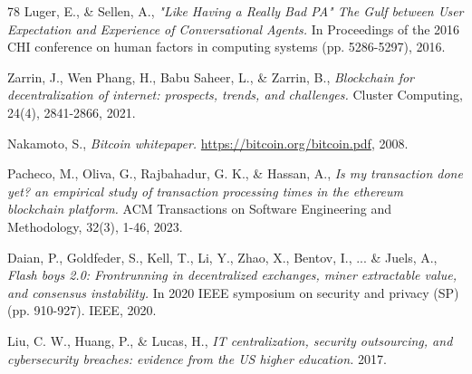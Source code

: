 \documentclass[preprint,12pt]{elsarticle}
\begin{document}
\begin{thebibliography}{78}
Luger, E., \& Sellen, A.,
\textit{"Like Having a Really Bad PA" The Gulf between User Expectation and Experience of Conversational Agents.}
In Proceedings of the 2016 CHI conference on human factors in computing systems (pp. 5286-5297), 2016.

Zarrin, J., Wen Phang, H., Babu Saheer, L., \& Zarrin, B.,
\textit{Blockchain for decentralization of internet: prospects, trends, and challenges.}
Cluster Computing, 24(4), 2841-2866, 2021.

Nakamoto, S.,
\textit{Bitcoin whitepaper.}
\url{https://bitcoin.org/bitcoin.pdf}, 2008.

Pacheco, M., Oliva, G., Rajbahadur, G. K., \& Hassan, A.,
\textit{Is my transaction done yet? an empirical study of transaction processing times in the ethereum blockchain platform.}
ACM Transactions on Software Engineering and Methodology, 32(3), 1-46, 2023.

Daian, P., Goldfeder, S., Kell, T., Li, Y., Zhao, X., Bentov, I., ... \& Juels, A.,
\textit{Flash boys 2.0: Frontrunning in decentralized exchanges, miner extractable value, and consensus instability.}
In 2020 IEEE symposium on security and privacy (SP) (pp. 910-927). IEEE, 2020.

Liu, C. W., Huang, P., \& Lucas, H.,
\textit{IT centralization, security outsourcing, and cybersecurity breaches: evidence from the US higher education.}
2017.


\end{thebibliography}
\end{document}
